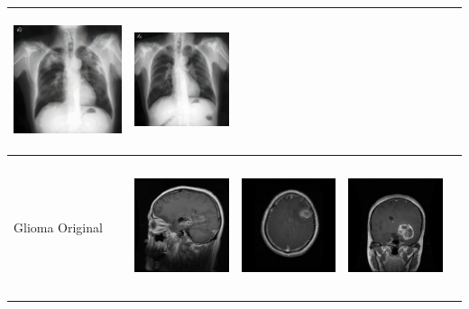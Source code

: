 \begin{table}[H]
\begin{tabularx}{\linewidth}{@{}>{\centering\arraybackslash}m{3cm}>{\centering\arraybackslash}X>{\centering\arraybackslash}X>{\centering\arraybackslash}X>{\centering\arraybackslash}X@{}}
\includegraphics[valign=M,width=\linewidth,height=4cm,keepaspectratio]{main/content/images/sd_dreambooth/dreambooth_xl_v1/xray/xray_1.png} & 
\includegraphics[valign=M,width=\linewidth,height=4cm,keepaspectratio]{main/content/images/sd_dreambooth/dreambooth_xl_v1/xray/xray_2.png} \\
\midrule
Glioma Original &
\includegraphics[valign=M,width=\linewidth,height=4cm,keepaspectratio]{main/content/images/brain_dreambooth_comparison/real/Tr-gl_0050.jpg} & 
\includegraphics[valign=M,width=\linewidth,height=4cm,keepaspectratio]{main/content/images/brain_dreambooth_comparison/real/Tr-gl_0165.jpg} & 
\includegraphics[valign=M,width=\linewidth,height=4cm,keepaspectratio]{main/content/images/brain_dreambooth_comparison/real/Tr-gl_0475.jpg} \\

\end{tabularx}
\end{table}
